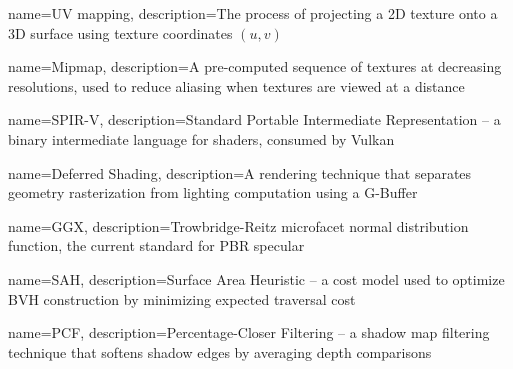 {
    name=UV mapping,
    description={The process of projecting a 2D texture onto a 3D surface using texture coordinates $(u, v)$}
}

{
    name=Mipmap,
    description={A pre-computed sequence of textures at decreasing resolutions, used to reduce aliasing when textures are viewed at a distance}
}

{
    name=SPIR-V,
    description={Standard Portable Intermediate Representation -- a binary intermediate language for shaders, consumed by Vulkan}
}

{
    name=Deferred Shading,
    description={A rendering technique that separates geometry rasterization from lighting computation using a G-Buffer}
}

{
    name=GGX,
    description={Trowbridge-Reitz microfacet normal distribution function, the current standard for PBR specular}
}

{
    name=SAH,
    description={Surface Area Heuristic -- a cost model used to optimize BVH construction by minimizing expected traversal cost}
}

{
    name=PCF,
    description={Percentage-Closer Filtering -- a shadow map filtering technique that softens shadow edges by averaging depth comparisons}
}

